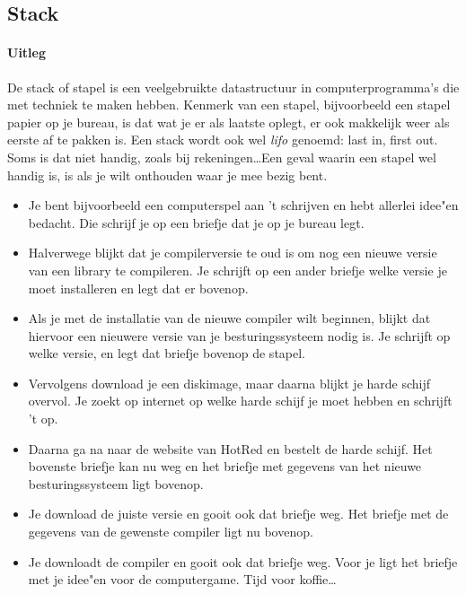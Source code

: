 \documentclass[a4paper,10pt]{article}
\begin{document}
\subsection*{Stack}

\paragraph{Uitleg}

De stack of stapel is een veelgebruikte datastructuur in computerprogramma's die met techniek te maken hebben.
Kenmerk van een stapel, bijvoorbeeld een stapel papier op je bureau, is dat wat je er als laatste oplegt, er ook makkelijk weer als eerste af te pakken is.
Een stack wordt ook wel \emph{lifo} genoemd: last in, first out.
Soms is dat niet handig, zoals bij rekeningen\dots Een geval waarin een stapel wel handig is, is als je wilt onthouden waar je mee bezig bent.

\begin{itemize}
\item Je bent bijvoorbeeld een computerspel aan 't schrijven en hebt allerlei idee"en bedacht.
Die schrijf je op een briefje dat je op je bureau legt.

\item Halverwege blijkt dat je compilerversie te oud is om nog een nieuwe versie van een library te compileren.
Je schrijft op een ander briefje welke versie je moet installeren en legt dat er bovenop.

\item Als je met de installatie van de nieuwe compiler wilt beginnen,
blijkt dat hiervoor een nieuwere versie van je besturingssysteem nodig is.
Je schrijft op welke versie, en legt dat briefje bovenop de stapel.

\item Vervolgens download je een diskimage, maar daarna blijkt je harde schijf overvol.
Je zoekt op internet op welke harde schijf je moet hebben en schrijft 't op.

\item Daarna ga na naar de website van HotRed en bestelt de harde schijf.
Het bovenste briefje kan nu weg en het briefje met gegevens van het nieuwe besturingssysteem ligt bovenop.

\item Je download de juiste versie en gooit ook dat briefje weg.
Het briefje met de gegevens van de gewenste compiler ligt nu bovenop.

\item Je downloadt de compiler en gooit ook dat briefje weg.
Voor je ligt het briefje met je idee"en voor de computergame.
Tijd voor koffie\dots
\end{itemize}
\end{document}
